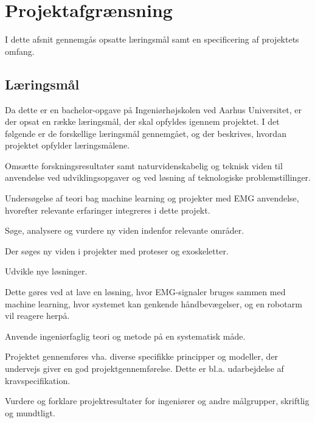 \thispagestyle{fancy}
\chapter{Projektafgrænsning}
\label{chp:projektafgraensning}
I dette afsnit gennemgås opsatte læringsmål samt en specificering af projektets omfang. 
\section{Læringsmål}
Da dette er en bachelor-opgave på Ingeniørhøjskolen ved Aarhus Universitet, er der opsat en række læringsmål, der skal opfyldes igennem projektet. I det følgende er de forskellige læringsmål gennemgået, og der beskrives, hvordan projektet opfylder læringsmålene.
\begin{myItemize}
	\item Omsætte forskningsresultater samt naturvidenskabelig og teknisk viden til anvendelse ved udviklingsopgaver og ved løsning af teknologiske problemstillinger.
	\begin{myItemize}
		\item Undersøgelse af teori bag machine learning og projekter med EMG anvendelse, hvorefter relevante erfaringer integreres i dette projekt. 
	\end{myItemize}
	\item Søge, analysere og vurdere ny viden indenfor relevante områder.
	\begin{myItemize}
		\item Der søges ny viden i projekter med proteser og exoskeletter. 
	\end{myItemize}
	\item Udvikle nye løsninger.
	\begin{myItemize}
		\item Dette gøres ved at lave en løsning, hvor EMG-signaler bruges sammen med machine learning, hvor systemet kan genkende håndbevægelser, og en robotarm vil reagere herpå.
	\end{myItemize}
	\item Anvende ingeniørfaglig teori og metode på en systematisk måde.
	\begin{myItemize}
		\item Projektet gennemføres vha. diverse specifikke principper og modeller, der undervejs giver en god projektgennemførelse. Dette er bl.a. udarbejdelse af kravspecifikation.
	\end{myItemize}
	\item Vurdere og forklare projektresultater for ingeniører og andre målgrupper, skriftlig og mundtligt.

\end{myItemize}
